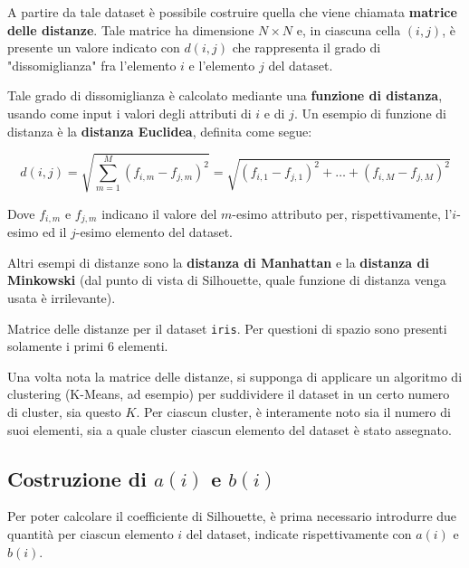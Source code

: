 \documentclass[italian]{article}
\begin{document}
			A partire da tale dataset è possibile costruire quella che viene
			chiamata \textbf{matrice delle distanze}. Tale matrice ha dimensione
			$N \times N$ e, in ciascuna cella $(i, j)$, è presente un valore
			indicato con $d(i, j)$ che rappresenta il grado di "dissomiglianza"
			fra l'elemento $i$ e l'elemento $j$ del dataset.

			Tale grado di dissomiglianza è calcolato mediante una
			\textbf{funzione di distanza}, usando come input i valori
			degli attributi di $i$ e di $j$. Un esempio di funzione di
			distanza è la \textbf{distanza Euclidea}, definita come segue:

			\begin{equation}
				d(i, j) =
				\sqrt{\sum_{m = 1}^{M} (f_{i, m} - f_{j, m})^{2}} =
				\sqrt{(f_{i, 1} - f_{j, 1})^{2} + \dots +
					(f_{i, M} - f_{j, M})^{2}}
			\end{equation}

			Dove $f_{i, m}$ e $f_{j, m}$ indicano il valore del $m$-esimo
			attributo per, rispettivamente, l'$i$-esimo ed il $j$-esimo
			elemento del dataset.

			Altri esempi di distanze sono la \textbf{distanza di Manhattan}
			e la \textbf{distanza di Minkowski} (dal punto di vista di
			Silhouette, quale funzione di distanza venga usata è irrilevante).

			\begin{table}[h]
				\centering
				\caption{Matrice delle distanze per il dataset \texttt{iris}. Per questioni
				di spazio sono presenti solamente i primi 6 elementi.}
				\label{tab:dist}
			\end{table}

			Una volta nota la matrice delle distanze, si supponga di applicare
			un algoritmo di clustering (K-Means, ad esempio) per suddividere il
			dataset in un certo numero di cluster, sia questo $K$. Per ciascun
			cluster, è interamente noto sia il numero di suoi elementi, sia
			a quale cluster ciascun elemento del dataset è stato assegnato.

		\subsection{Costruzione di $a(i)$ e $b(i)$}

			Per poter calcolare il coefficiente di Silhouette, è prima necessario
			introdurre due quantità per ciascun elemento $i$ del dataset, indicate
			rispettivamente con $a(i)$ e $b(i)$.
\end{document}
